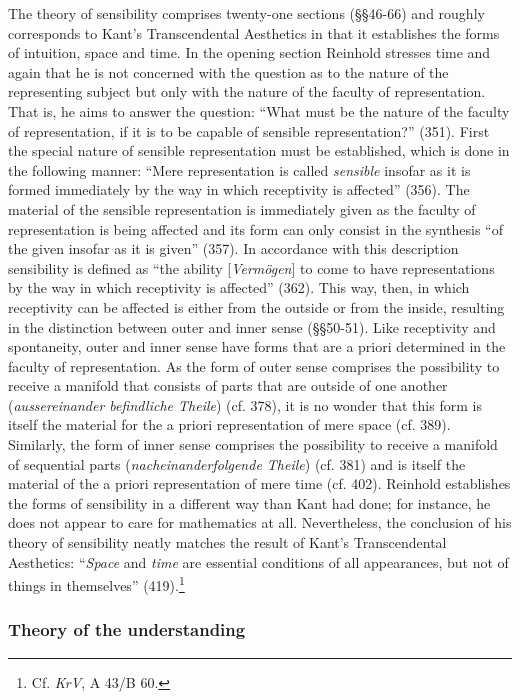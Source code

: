 The theory of sensibility comprises twenty{-}one sections (\S \S  46{-}66) and roughly corresponds to Kant's Transcendental Aesthetics in that it establishes the forms of intuition, space and time. In the opening section Reinhold stresses time and again that he is not concerned with the question as to the nature of the representing subject but only with the nature of the faculty of representation. That is, he aims to answer the question: ``What must be the nature of the faculty of representation, if it is to be capable of sensible representation?'' (351). First the special nature of sensible representation must be established, which is done in the following manner: ``Mere representation is called \textit{sensible} insofar as it is formed immediately by the way in which receptivity is affected'' (356). The material of the sensible representation is immediately given as the faculty of representation is being affected and its form can only consist in the synthesis ``of the given insofar as it is given'' (357). In accordance with this description sensibility is defined as ``the ability [\textit{Verm\"{o}gen}] to come to have representations by the way in which receptivity is affected'' (362). This way, then, in which receptivity can be affected is either from the outside or from the inside, resulting in the distinction between outer and inner sense (\S \S  50{-}51). Like receptivity and spontaneity, outer and inner sense have forms that are a priori determined in the faculty of representation. As the form of outer sense comprises the possibility to receive a manifold that consists of parts that are outside of one another (\textit{aussereinander befindliche Theile}) (cf. 378), it is no wonder that this form is itself the material for the a priori representation of mere space (cf. 389). Similarly, the form of inner sense comprises the possibility to receive a manifold of sequential parts (\textit{nacheinanderfolgende Theile}) (cf. 381) and is itself the material of the a priori representation of mere time (cf. 402). Reinhold establishes the forms of sensibility in a different way than Kant had done; for instance, he does not appear to care for mathematics at all. Nevertheless, the conclusion of his theory of sensibility neatly matches the result of Kant's Transcendental Aesthetics: ``\textit{Space }and \textit{time} are essential conditions of all appearances, but not of things in themselves'' (419).\footnote{ Cf. \textit{KrV}, A 43/B 60. }


\subsubsection{Theory of the understanding}


